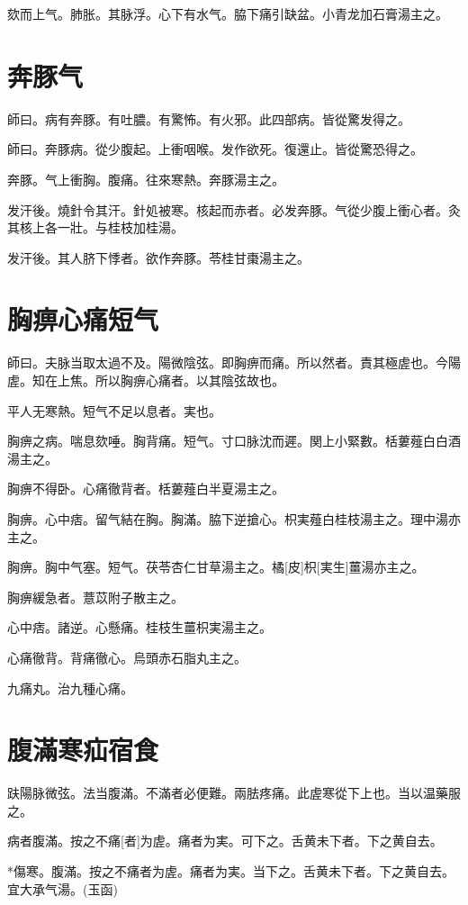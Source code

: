 \documentclass[12pt,twoside,UTF8,b5paper]{ctexbook}
\begin{document}
欬而上气。肺胀。其脉浮。心下有水气。脇下痛引缺盆。小青龙加石膏湯主之。

\chapter{奔豚气}

師曰。病有奔豚。有吐膿。有驚怖。有火邪。此四部病。皆從驚发得之。

師曰。奔豚病。從少腹起。上衝咽喉。发作欲死。復還止。皆從驚恐得之。

奔豚。气上衝胸。腹痛。往來寒熱。奔豚湯主之。

发汗後。燒針令其汗。針処被寒。核起而赤者。必发奔豚。气從少腹上衝心者。灸其核上各一壯。与桂枝加桂湯。

发汗後。其人脐下悸者。欲作奔豚。苓桂甘棗湯主之。

\chapter{胸痹心痛短气}

師曰。夫脉当取太過不及。陽微陰弦。即胸痹而痛。所以然者。責其極虗也。今陽虗。知在上焦。所以胸痹心痛者。以其陰弦故也。

平人无寒熱。短气不足以息者。実也。

胸痹之病。喘息欬唾。胸背痛。短气。寸口脉沈而遲。関上小緊數。栝蔞薤白白酒湯主之。

胸痹不得卧。心痛徹背者。栝蔞薤白半夏湯主之。

胸痹。心中痞。留气結在胸。胸滿。脇下逆搶心。枳実薤白桂枝湯主之。理中湯亦主之。

胸痹。胸中气塞。短气。茯苓杏仁甘草湯主之。橘[皮]枳[実生]薑湯亦主之。

胸痹緩急者。薏苡附子散主之。

心中痞。諸逆。心懸痛。桂枝生薑枳実湯主之。

心痛徹背。背痛徹心。烏頭赤石脂丸主之。

九痛丸。治九種心痛。

\chapter{腹滿寒疝宿食}

趺陽脉微弦。法当腹滿。不滿者必便難。兩胠疼痛。此虗寒從下上也。当以温藥服之。

病者腹滿。按之不痛[者]为虗。痛者为実。可下之。舌黄未下者。下之黄自去。

*傷寒。腹滿。按之不痛者为虗。痛者为実。当下之。舌黄未下者。下之黄自去。宜大承气湯。(玉函)
\end{document}
